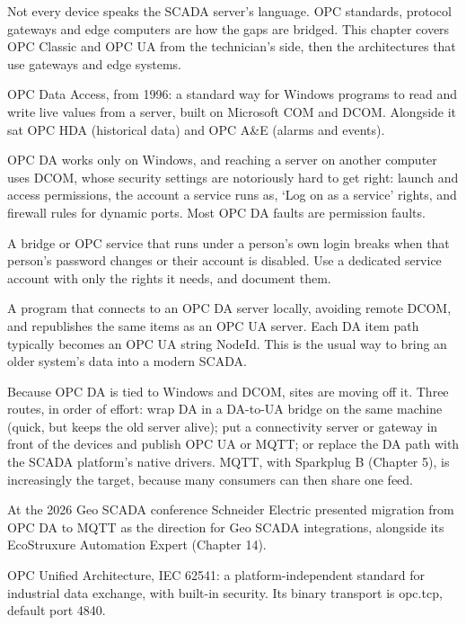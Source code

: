 Not every device speaks the SCADA server's language. OPC standards, protocol gateways and edge computers are how the gaps are bridged. This chapter covers OPC Classic and OPC UA from the technician's side, then the architectures that use gateways and edge systems.

 OPC Data Access, from 1996: a standard way for Windows programs to read and write live values from a server, built on Microsoft COM and DCOM. Alongside it sat OPC HDA (historical data) and OPC A\&E (alarms and events).

OPC DA works only on Windows, and reaching a server on another computer uses DCOM, whose security settings are notoriously hard to get right: launch and access permissions, the account a service runs as, ‘Log on as a service’ rights, and firewall rules for dynamic ports. Most OPC DA faults are permission faults.

 A bridge or OPC service that runs under a person's own login breaks when that person's password changes or their account is disabled. Use a dedicated service account with only the rights it needs, and document them.

 A program that connects to an OPC DA server locally, avoiding remote DCOM, and republishes the same items as an OPC UA server. Each DA item path typically becomes an OPC UA string NodeId. This is the usual way to bring an older system's data into a modern SCADA.

Because OPC DA is tied to Windows and DCOM, sites are moving off it. Three routes, in order of effort: wrap DA in a DA-to-UA bridge on the same machine (quick, but keeps the old server alive); put a connectivity server or gateway in front of the devices and publish OPC UA or MQTT; or replace the DA path with the SCADA platform's native drivers. MQTT, with Sparkplug B (Chapter 5), is increasingly the target, because many consumers can then share one feed.

 At the 2026 Geo SCADA conference Schneider Electric presented migration from OPC DA to MQTT as the direction for Geo SCADA integrations, alongside its EcoStruxure Automation Expert (Chapter 14).

 OPC Unified Architecture, IEC 62541: a platform-independent standard for industrial data exchange, with built-in security. Its binary transport is opc.tcp, default port 4840.

